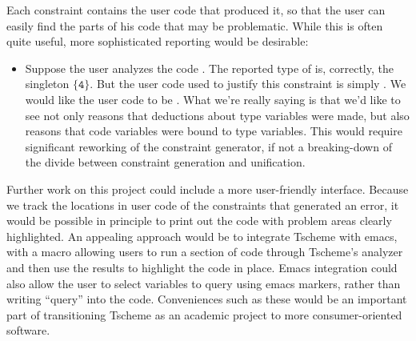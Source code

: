 \documentclass[a4paper]{article}
\begin{document}
Each constraint contains the user code that produced it, so that the user can
easily find the parts of his code that may be problematic.  While this is often
quite useful, more sophisticated reporting would be desirable:

\begin{itemize}
  \item Suppose the user analyzes the code .  The reported type
    of  is, correctly, the singleton $\{\mathtt{4}\}$.  But the user code
    used to justify this constraint is simply .  We would like the user
    code to be .  What we're really saying is that we'd like to
    see not only reasons that deductions about type variables were made, but
    also reasons that code variables were bound to type variables.  This would
    require significant reworking of the constraint generator, if not a
    breaking-down of the divide between constraint generation and unification.
\end{itemize}




Further work on this project could include a more user-friendly interface.  
Because we track the locations in user code of the constraints that generated
an error, it would be possible in principle to print out the code with problem 
areas clearly highlighted.  An appealing approach would be to integrate 
Tscheme with emacs, with a macro allowing users to run a section of code 
through Tscheme's analyzer and then use the results to highlight the code in 
place.  Emacs integration could also allow the user to select variables to 
query using emacs markers, rather than writing ``query'' into the code.
Conveniences such as these would be an important part of transitioning Tscheme 
as an academic project to more consumer-oriented software.  
\end{document}
